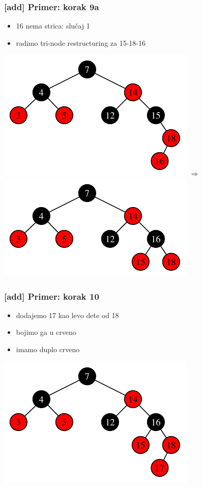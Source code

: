 \documentclass[compress,aspectratio=169]{beamer}
\begin{document}
\begin{frame}[fragile]
  \frametitle{[add] Primer: korak 9a}
  \begin{itemize}
    \item 16 nema strica: slučaj 1
    \item radimo tri-node restructuring za 15-18-16
  \end{itemize}
  \begin{center}
    \includegraphics[scale=0.8]{asp-11-add-13.pdf} $\Rightarrow$
    \includegraphics[scale=0.8]{asp-11-add-14.pdf}
  \end{center}
\end{frame}

\begin{frame}[fragile]
  \frametitle{[add] Primer: korak 10}
  \begin{itemize}
    \item dodajemo 17 kao levo dete od 18
    \item bojimo ga u crveno
    \item imamo duplo crveno
  \end{itemize}
  \begin{center}
    \includegraphics[scale=0.8]{asp-11-add-15.pdf}
  \end{center}
\end{frame}
\end{document}
